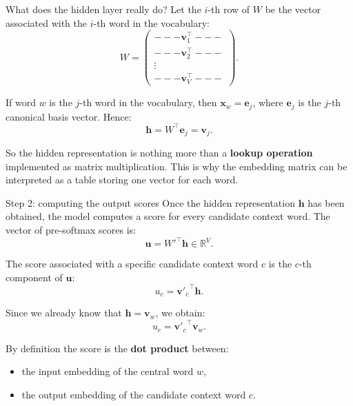 \documentclass[11pt,aspectratio=169,professionalfonts]{beamer}
\begin{document}
%
%
\begin{frame}{What does the hidden layer really do?}
Let the $i$-th row of $W$ be the vector associated with the $i$-th word in the vocabulary:
\[
W =
\begin{pmatrix}
--- \bm{v}_1^\top --- \\
--- \bm{v}_2^\top --- \\
\vdots \\
--- \bm{v}_V^\top ---
\end{pmatrix}.
\]

If word $w$ is the $j$-th word in the vocabulary, then $\bm{x}_w = \bm{e}_j$, where $\bm{e}_j$ is the $j$-th canonical basis vector. Hence:
\[
\bm{h} = W^\top \bm{e}_j = \bm{v}_j.
\]

\vspace{0.3cm}

So the hidden representation is nothing more than a \textbf{lookup operation} implemented as matrix multiplication. This is why the embedding matrix can be interpreted as a table storing one vector for each word.
\end{frame}
%
%
\begin{frame}{Step 2: computing the output scores}
Once the hidden representation $\bm{h}$ has been obtained, the model computes a score for every candidate context word. The vector of pre-softmax scores is:
\[
\bm{u} = W'^\top \bm{h} \in \mathbb{R}^{V}.
\]

The score associated with a specific candidate context word $c$ is the $c$-th component of $\bm{u}$:
\[
u_c = {\bm{v}'_c}^\top \bm{h}.
\]

Since we already know that $\bm{h} = \bm{v}_w$, we obtain:
\[
u_c = {\bm{v}'_c}^\top \bm{v}_w.
\]

By definition the score is the \textbf{dot product} between:
\begin{itemize}
    \item the input embedding of the central word $w$,
    \item the output embedding of the candidate context word $c$.
\end{itemize}
\end{frame}
%
%
\end{document}
